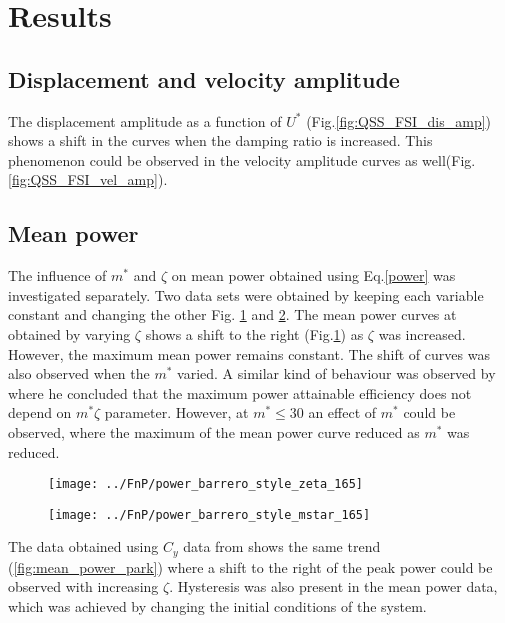 
\section{Results}

\subsection{Displacement and velocity amplitude}

The displacement amplitude as a function of $U^*$ (Fig.\ref{fig:QSS_FSI_dis_amp}) shows a shift in the curves when the damping ratio is increased. This phenomenon could be observed in the velocity amplitude curves as well(Fig. \ref{fig:QSS_FSI_vel_amp}).

\subsection{Mean power}

The influence of $m^*$ and $\zeta$ on mean power obtained using Eq.\ref{power}  was investigated separately. Two data sets were obtained by keeping each variable constant and changing the other  Fig. \ref{fig:power_barrero_style_zeta_165} and \ref{fig:power_barrero_style_mstar_165}. The mean power curves at obtained by varying $\zeta$ shows a shift to the right (Fig.\ref{fig:power_barrero_style_zeta_165}) as $\zeta$ was increased. However, the maximum mean power remains constant.  The shift of curves was also observed when the $m^*$ varied. A similar kind of behaviour was observed by \cite{Barrero-Gil2010a} where he concluded that the maximum power attainable efficiency does not depend on $m^*\zeta$ parameter. However, at $m^* \leq 30$ an effect of $m^*$ could be observed, where the maximum of the mean power curve reduced as $m^*$ was reduced.

\begin{figure}
\centering
\texttt{[image: ../FnP/power\_barrero\_style\_zeta\_165]}
\caption{}
\label{fig:power_barrero_style_zeta_165}
\end{figure}


\begin{figure}
\centering
\texttt{[image: ../FnP/power\_barrero\_style\_mstar\_165]}
\caption{}
\label{fig:power_barrero_style_mstar_165}
\end{figure}


The data obtained using $C_y$ data from \cite{Parkinson1964} shows the same trend (\ref{fig:mean_power_park}) where a shift to the right of the peak power could be observed with increasing $\zeta$. Hysteresis was also present in the mean power data, which was achieved by changing the initial conditions of the system.


